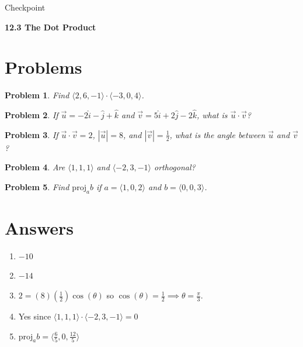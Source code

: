 \documentclass[11pt]{article}
\newtheorem{problem}{Problem}
\newcommand{\vs}{\vspace*{.1in}}
\begin{document}
\begin{huge}
    \begin{center}
        Checkpoint
    \end{center}
\end{huge}
\begin{large}\begin{center}\bf 12.3 The Dot Product\end{center}
\end{large}

\vs\vs

\section{Problems}

\begin{problem}
Find $\langle 2,6,-1\rangle \cdot \langle -3,0,4\rangle$.   
\end{problem}

\begin{problem}
    If $\Vec{u} = -2\hat{i}-\hat{j}+\hat{k}$ and $\Vec{v}= 5\hat{i}+2\hat{j}-2\hat{k}$, what is $\Vec{u}\cdot \Vec{v}$?
\end{problem}

\begin{problem}
    If $\vec{u}\cdot \vec{v} = 2$, $|\vec{u}|=8$, and $|\vec{v}|=\frac{1}{2}$, what is the angle between $\Vec{u}$ and $\vec{v}$? 
\end{problem}

\begin{problem}
    Are $\langle 1,1,1 \rangle$ and $\langle -2,3,-1\rangle$ orthogonal?
\end{problem}

\begin{problem}
    Find $\text{proj}_ab$ if $a = \langle 1,0,2 \rangle$ and $b = \langle 0,0,3 \rangle$.
\end{problem}

\newpage

\section{Answers}

\begin{enumerate}
    \item $-10$
    \item $-14$
    \item $2 = (8)(\frac{1}{2})\cos(\theta)$ so $\cos(\theta) = \frac{1}{2} \implies \theta = \frac{\pi}{3}$.
    \item Yes since $\langle 1,1,1 \rangle \cdot \langle -2,3,-1\rangle = 0$
    \item $\text{proj}_ab = \langle \frac{6}{5}, 0, \frac{12}{5}\rangle $
\end{enumerate}
\end{document}
